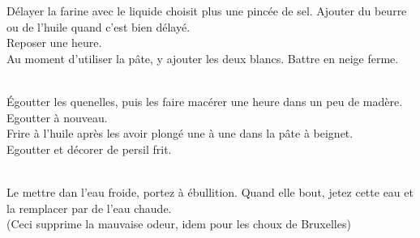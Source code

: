 \begin{minipage}[c]{\textwidth}
Délayer la farine avec le liquide choisit plus une pincée de sel. Ajouter du beurre ou de l’huile quand c’est bien délayé.\\
Reposer une heure. \\
Au moment d’utiliser la pâte, y ajouter les deux blancs. Battre en neige ferme. \\
\\

\end{minipage}

\begin{minipage}[c]{\textwidth}
Égoutter les quenelles, puis les faire macérer une heure dans un peu de madère. Egoutter à nouveau. \\
Frire à l’huile après les avoir plongé une à une dans la pâte à beignet. \\
Egoutter et décorer de persil frit.\\
\\

\end{minipage}

\begin{minipage}[c]{\textwidth}
Le mettre dan l'eau froide, portez à ébullition. Quand elle bout, jetez cette eau et la remplacer par de l'eau chaude.\\
(Ceci supprime la mauvaise odeur, idem pour les choux de Bruxelles)\\
\\

\end{minipage}


